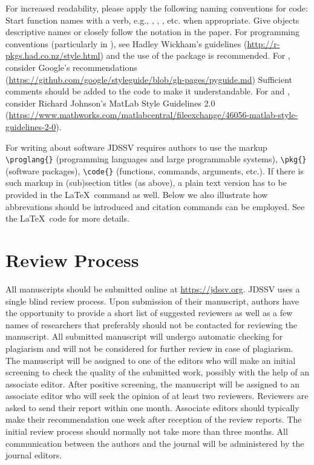 \documentclass[
]{jdssv}
\begin{document}
\begin{sloppypar}
For increased readability, please apply the following naming conventions for code: Start function names with a verb, e.g., , , , etc. when appropriate. Give  objects descriptive names or closely follow the notation in the paper.
For programming conventions (particularly in ), see Hadley Wickham's guidelines (\url{http://r-pkgs.had.co.nz/style.html}) and the use of the  package is recommended. For , consider Google's recommendations (\url{https://github.com/google/styleguide/blob/gh-pages/pyguide.md}) Sufficient comments should be added to the code to make it understandable. For  and  \citep{matlab}, consider Richard Johnson's MatLab Style Guidelines 2.0 (\url{https://www.mathworks.com/matlabcentral/fileexchange/46056-matlab-style-guidelines-2-0}).
\end{sloppypar}

For writing about software JDSSV requires authors to use the markup
\verb|\proglang{}| (programming languages and large programmable
systems), \verb|\pkg{}| (software packages), \verb|\code{}| (functions,
commands, arguments, etc.). If there is such markup in (sub)section
titles (as above), a plain text version has to be provided in the
\LaTeX~command as well. Below we also illustrate how abbrevations should
be introduced and citation commands can be employed. See the \LaTeX~code
for more details.

\hypertarget{review-process}{%
\section{Review Process}\label{review-process}}

All manuscripts should be submitted online at \url{https://jdssv.org}.
JDSSV uses a single blind review process. Upon submission of their
manuscript, authors have the opportunity to provide a short list of
suggested reviewers as well as a few names of researchers that
preferably should not be contacted for reviewing the manuscript. All
submitted manuscript will undergo automatic checking for plagiarism and
will not be considered for further review in case of plagiarism. The
manuscript will be assigned to one of the editors who will make an
initial screening to check the quality of the submitted work, possibly
with the help of an associate editor. After positive screening, the
manuscript will be assigned to an associate editor who will seek the
opinion of at least two reviewers. Reviewers are asked to send their
report within one month. Associate editors should typically make their
recommendation one week after reception of the review reports. The
initial review process should normally not take more than three months.
All communication between the authors and the journal will be
administered by the journal editors.
\end{document}
